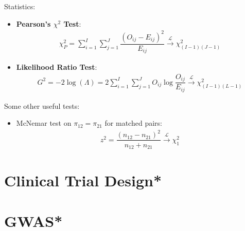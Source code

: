     Statistics:
    \begin{itemize}[topsep=2pt,itemsep=0pt]
        \item \textbf{Pearson's $ \chi^2 $ Test}:
        \begin{align}
            \chi^2_P=\sum_{i=1}^I\sum_{j=1}^J\dfrac{(O_{ij}-E_{ij})^2}{E_{ij}}\xrightarrow[]{\mathscr{L}} \chi^2_{(I-1)(J-1)}
        \end{align}
        
        
        \item \textbf{Likelihood Ratio Test}:
        \begin{align}
            G^2=-2\log(\Lambda )=2\sum_{i=1}^I\sum_{j=1}^JO_{ij}\log\dfrac{O_{ij}}{E_{ij}}\xrightarrow[]{\mathscr{L}} \chi^2_{(I-1)(L-1)} 
        \end{align}
    \end{itemize}
    
    Some other useful tests:
    \begin{itemize}[topsep=2pt,itemsep=0pt]
        \item McNemar test on $ \pi_{12}=\pi_{21} $ for matched pairs:
        \begin{align}
            z^2=\dfrac{(n_{12}-n_{21})^2}{{n_{12}+n_{21}}} \xrightarrow[]{\mathscr{L}} \chi^2_1
        \end{align}
        
        
    \end{itemize}
    
        

\section{Clinical Trial Design*}
\section{GWAS*}






